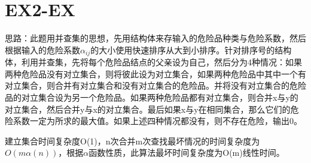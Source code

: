 \documentclass[UTF8, 11pt]{ctexart}
\begin{document}
	\section*{EX2-EX}
	\par{思路：此题用并查集的思想，先用结构体来存输入的危险品种类与危险系数，然后根据输入的危险系数$\alpha_{ij}$的大小使用快速排序从大到小排序。针对排序号的结构体，利用并查集，先将每个危险品结点的父亲设为自己，然后分为4种情况：如果两种危险品没有对立集合，则将彼此设为对立集合，如果两种危险品中其中一个有对立集合，则合并有对立集合和没有对立集合的危险品。并将没有对立集合的危险品的对立集合设为另一个危险品。如果两种危险品都有对立集合，则合并x与y的对立集合，然后合并y与x的对立集合。最后如果x与y在相同集合，那么它们的危险系数一定为所求的最大值。如果上述四种情况都没有，则不存在危险，输出0。}
	\par{建立集合时间复杂度O(1)，n次合并m次查找最坏情况的时间复杂度为$O(m\alpha(n))$，根据$\alpha$函数性质，此算法最坏时间复杂度为O(m)线性时间。}
\end{document}
